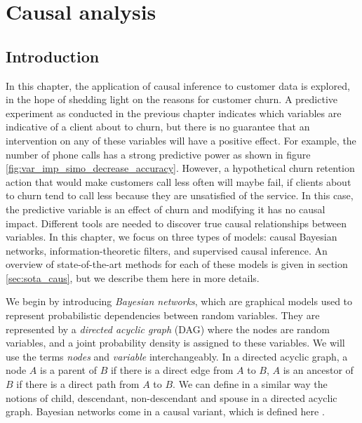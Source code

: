\chapter{Causal analysis}
\label{ch:caus}

\section{Introduction}
\label{sec:causal_intro}

In this chapter, the application of causal inference to customer data is
explored, in the hope of shedding light on the reasons for customer churn. A
predictive experiment as conducted in the previous chapter indicates which
variables are indicative of a client about to churn, but there is no guarantee
that an intervention on any of these variables will have a positive effect. For
example, the number of phone calls has a strong predictive power as shown in
figure \ref{fig:var_imp_simo_decrease_accuracy}. However, a hypothetical churn
retention action that would make customers call less often will maybe fail, if
clients about to churn tend to call less because they are unsatisfied of the
service. In this case, the predictive variable is an effect of churn and
modifying it has no causal impact. Different tools are needed to discover true
causal relationships between variables. In this chapter, we focus on three types
of models: causal Bayesian networks, information-theoretic filters, and
supervised causal inference. An overview of state-of-the-art methods for each of
these models is given in section \ref{sec:sota_caus}, but we describe them here
in more details.

We begin by introducing \emph{Bayesian networks}, which are graphical models used
to represent probabilistic dependencies between random variables. They are
represented by a \emph{directed acyclic graph} (DAG) where the nodes are random
variables, and a joint probability density is assigned to these variables. We
will use the terms \emph{nodes} and \emph{variable} interchangeably. In a
directed acyclic graph, a node $A$ is a parent of $B$ if there is a direct edge
from $A$ to $B$, $A$ is an ancestor of $B$ if there is a direct path from $A$ to
$B$. We can define in a similar way the notions of child, descendant,
non-descendant and spouse in a directed acyclic graph. Bayesian networks come in
a causal variant, which is defined here \parencite{guyon2007causal}.

